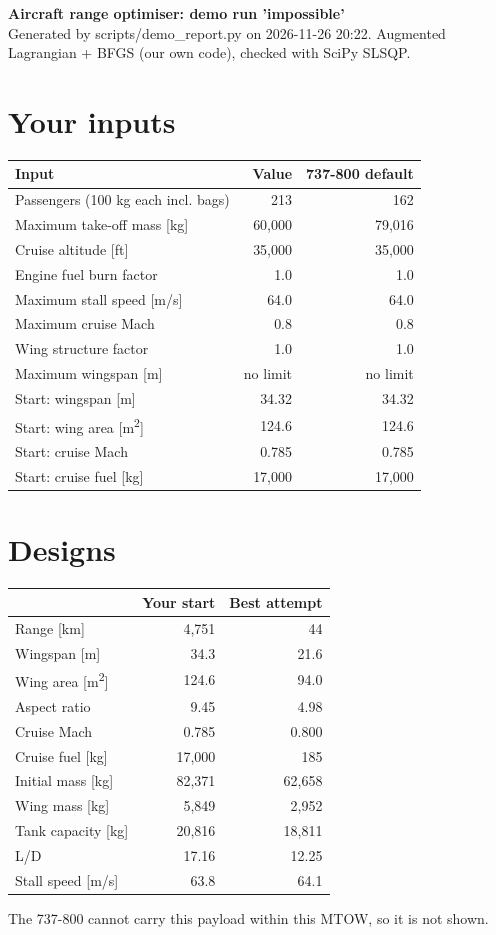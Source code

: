 \documentclass[10pt,a4paper]{article}
\begin{document}
\begin{center}{\Large\bfseries Aircraft range optimiser: demo run 'impossible'}\\[4pt]
{\small Generated by scripts/demo\_report.py on 2026-11-26 20:22. Augmented Lagrangian + BFGS (our own code), checked with SciPy SLSQP.}\end{center}
\section{Your inputs}
\begin{table}[H]\centering\small
\begin{tabular}{lrr}
\toprule
\textbf{Input} & \textbf{Value} & \textbf{737-800 default} \\
\midrule
Passengers (100 kg each incl. bags) & 213 & 162 \\
Maximum take-off mass [kg] & 60,000 & 79,016 \\
Cruise altitude [ft] & 35,000 & 35,000 \\
Engine fuel burn factor & 1.0 & 1.0 \\
Maximum stall speed [m/s] & 64.0 & 64.0 \\
Maximum cruise Mach & 0.8 & 0.8 \\
Wing structure factor & 1.0 & 1.0 \\
Maximum wingspan [m] & no limit & no limit \\
Start: wingspan [m] & 34.32 & 34.32 \\
Start: wing area [m\textsuperscript{2}] & 124.6 & 124.6 \\
Start: cruise Mach & 0.785 & 0.785 \\
Start: cruise fuel [kg] & 17,000 & 17,000 \\
\bottomrule
\end{tabular}
\end{table}
\section{Designs}
\begin{table}[H]\centering\small
\begin{tabular}{lrr}
\toprule
\textbf{} & \textbf{Your start} & \textbf{Best attempt} \\
\midrule
Range [km] & 4,751 & 44 \\
Wingspan [m] & 34.3 & 21.6 \\
Wing area [m\textsuperscript{2}] & 124.6 & 94.0 \\
Aspect ratio & 9.45 & 4.98 \\
Cruise Mach & 0.785 & 0.800 \\
Cruise fuel [kg] & 17,000 & 185 \\
Initial mass [kg] & 82,371 & 62,658 \\
Wing mass [kg] & 5,849 & 2,952 \\
Tank capacity [kg] & 20,816 & 18,811 \\
L/D & 17.16 & 12.25 \\
Stall speed [m/s] & 63.8 & 64.1 \\
\bottomrule
\end{tabular}
\end{table}
The 737-800 cannot carry this payload within this MTOW, so it is not shown.
\end{document}
